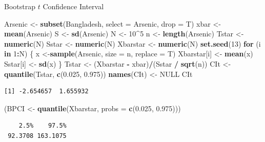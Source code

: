 \documentclass[
  ignorenonframetext,
]{beamer}
\newenvironment{Shaded}{\begin{snugshade}}{\end{snugshade}}
\newcommand{\AttributeTok}[1]{\textcolor[rgb]{0.13,0.29,0.53}{#1}}
\newcommand{\ConstantTok}[1]{\textcolor[rgb]{0.56,0.35,0.01}{#1}}
\newcommand{\ControlFlowTok}[1]{\textcolor[rgb]{0.13,0.29,0.53}{\textbf{#1}}}
\newcommand{\DecValTok}[1]{\textcolor[rgb]{0.00,0.00,0.81}{#1}}
\newcommand{\FloatTok}[1]{\textcolor[rgb]{0.00,0.00,0.81}{#1}}
\newcommand{\FunctionTok}[1]{\textcolor[rgb]{0.13,0.29,0.53}{\textbf{#1}}}
\newcommand{\NormalTok}[1]{#1}
\newcommand{\OtherTok}[1]{\textcolor[rgb]{0.56,0.35,0.01}{#1}}
\newcommand{\SpecialCharTok}[1]{\textcolor[rgb]{0.81,0.36,0.00}{\textbf{#1}}}
\begin{document}
\begin{frame}[fragile]{Bootstrap \(t\) Confidence Interval}
\protect\hypertarget{bootstrap-t-confidence-interval-4}{}
\tiny

\begin{Shaded}
\begin{Highlighting}[]
\NormalTok{Arsenic }\OtherTok{\textless{}{-}} \FunctionTok{subset}\NormalTok{(Bangladesh, }\AttributeTok{select =}\NormalTok{ Arsenic, }\AttributeTok{drop =}\NormalTok{ T)}
\NormalTok{xbar }\OtherTok{\textless{}{-}} \FunctionTok{mean}\NormalTok{(Arsenic)}
\NormalTok{S }\OtherTok{\textless{}{-}} \FunctionTok{sd}\NormalTok{(Arsenic)}
\NormalTok{N }\OtherTok{\textless{}{-}} \DecValTok{10}\SpecialCharTok{\^{}}\DecValTok{5}
\NormalTok{n }\OtherTok{\textless{}{-}} \FunctionTok{length}\NormalTok{(Arsenic)}
\NormalTok{Tstar }\OtherTok{\textless{}{-}} \FunctionTok{numeric}\NormalTok{(N)}
\NormalTok{Sstar }\OtherTok{\textless{}{-}} \FunctionTok{numeric}\NormalTok{(N)}
\NormalTok{Xbarstar }\OtherTok{\textless{}{-}} \FunctionTok{numeric}\NormalTok{(N)}
\FunctionTok{set.seed}\NormalTok{(}\DecValTok{13}\NormalTok{)}
\ControlFlowTok{for}\NormalTok{ (i }\ControlFlowTok{in} \DecValTok{1}\SpecialCharTok{:}\NormalTok{N)}
\NormalTok{\{}
\NormalTok{  x }\OtherTok{\textless{}{-}}\FunctionTok{sample}\NormalTok{(Arsenic, }\AttributeTok{size =}\NormalTok{ n, }\AttributeTok{replace =}\NormalTok{ T)}
\NormalTok{  Xbarstar[i] }\OtherTok{\textless{}{-}} \FunctionTok{mean}\NormalTok{(x)}
\NormalTok{  Sstar[i] }\OtherTok{\textless{}{-}} \FunctionTok{sd}\NormalTok{(x)}
\NormalTok{\}}
\NormalTok{Tstar }\OtherTok{\textless{}{-}}\NormalTok{ (Xbarstar }\SpecialCharTok{{-}}\NormalTok{ xbar)}\SpecialCharTok{/}\NormalTok{(Sstar }\SpecialCharTok{/} \FunctionTok{sqrt}\NormalTok{(n))}
\NormalTok{CIt }\OtherTok{\textless{}{-}} \FunctionTok{quantile}\NormalTok{(Tstar, }\FunctionTok{c}\NormalTok{(}\FloatTok{0.025}\NormalTok{, }\FloatTok{0.975}\NormalTok{))}
\FunctionTok{names}\NormalTok{(CIt) }\OtherTok{\textless{}{-}} \ConstantTok{NULL}
\NormalTok{CIt}
\end{Highlighting}
\end{Shaded}

\begin{verbatim}
[1] -2.654657  1.655932
\end{verbatim}

\begin{Shaded}
\begin{Highlighting}[]
\NormalTok{(BPCI }\OtherTok{\textless{}{-}} \FunctionTok{quantile}\NormalTok{(Xbarstar, }\AttributeTok{probs =} \FunctionTok{c}\NormalTok{(}\FloatTok{0.025}\NormalTok{, }\FloatTok{0.975}\NormalTok{)))}
\end{Highlighting}
\end{Shaded}

\begin{verbatim}
    2.5%    97.5% 
 92.3708 163.1075 
\end{verbatim}

\normalsize
\end{frame}
\end{document}
